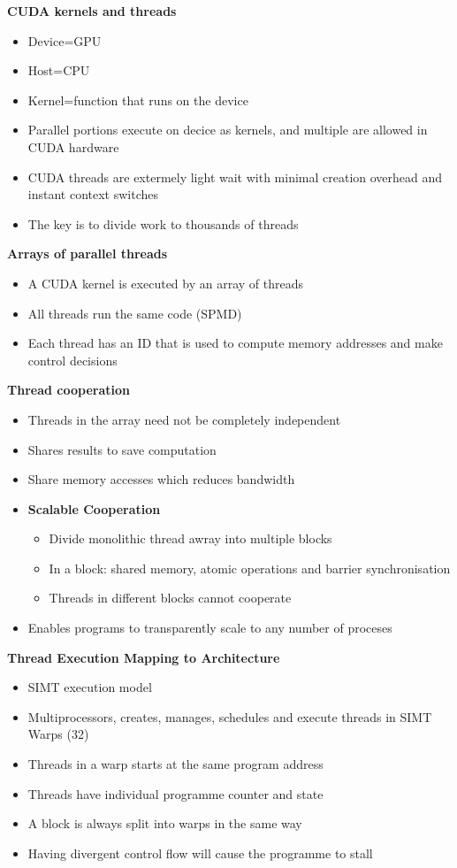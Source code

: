 \documentclass[10pt, landscape]{article}
\begin{document}
\begin{multicols}{4}
\textbf{CUDA kernels and threads}
\begin{itemize}
    \item Device=GPU
    \item Host=CPU
    \item Kernel=function that runs on the device
    \item Parallel portions execute on decice as kernels, and multiple are allowed in CUDA hardware 
    \item CUDA threads are extermely light wait with minimal creation overhead and instant context switches 
    \item The key is to divide work to thousands of threads
\end{itemize}
 
\textbf{Arrays of parallel threads}
\begin{itemize}
    \item A CUDA kernel is executed by an array of threads 
    \item All threads run the same code (SPMD)
    \item Each thread has an ID that is used to compute memory addresses and make control decisions 
\end{itemize}

\textbf{Thread cooperation}
\begin{itemize}
    \item Threads in the array need not be completely independent 
    \item Shares results to save computation 
    \item Share memory accesses which reduces bandwidth 
    \item \textbf{Scalable Cooperation}
    \begin{itemize}
        \item Divide monolithic thread awray into multiple blocks
        \item In a block: shared memory, atomic operations and barrier synchronisation 
        \item Threads in different blocks cannot cooperate 
    \end{itemize}
    \item Enables programs to transparently scale to any number of proceses 
\end{itemize}


 \textbf{Thread Execution Mapping to Architecture}
 \begin{itemize}
    \item SIMT execution model
    \item Multiprocessors, creates, manages, schedules and execute threads in SIMT Warps (32)
    \item Threads in a warp starts at the same program address 
    \item Threads have individual programme counter and state 
    \item A block is always split into warps in the same way 
    \item Having divergent control flow will cause the programme to stall 
 \end{itemize}


\end{multicols}
\end{document}

